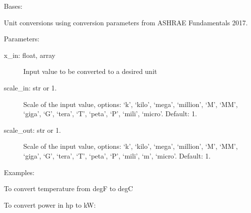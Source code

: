 \documentclass[letterpaper,10pt,english,openany]{sphinxmanual}
\begin{document}
\begin{fulllineitems}
\label{\detokenize{source/mswh.tools:mswh.tools.unit_converters.UnitConv}}
Bases: 

Unit conversions using conversion parameters from
ASHRAE Fundamentals 2017.

Parameters:
\begin{description}
\item[{x\_in: float, array}] \leavevmode
Input value to be converted to a desired unit

\item[{scale\_in: str or 1.}] \leavevmode
Scale of the input value, options: ‘k’, ‘kilo’,
‘mega’, ‘million’, ‘M’, ‘MM’, ‘giga’, ‘G’, ‘tera’, ‘T’,
‘peta’, ‘P’, ‘mili’, ‘micro’.
Default: 1.

\item[{scale\_out: str or 1.}] \leavevmode
Scale of the input value, options: ‘k’, ‘kilo’,
‘mega’, ‘million’, ‘M’, ‘MM’, ‘giga’, ‘G’, ‘tera’, ‘T’,
‘peta’, ‘P’, ‘mili’, ‘m’, ‘micro’.
Default: 1.

\end{description}

Examples:

To convert temperature from degF to degC

\begin{sphinxVerbatim}[commandchars=\\\{\}]
  
\end{sphinxVerbatim}

To convert power in hp to kW:

\begin{sphinxVerbatim}[commandchars=\\\{\}]
   
\end{sphinxVerbatim}


\end{fulllineitems}
\end{document}
